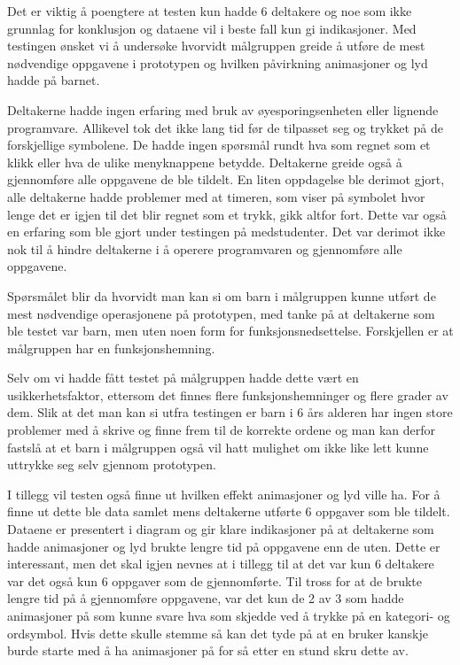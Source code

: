 Det er viktig å poengtere at testen kun hadde 6 deltakere og noe som ikke grunnlag for konklusjon og dataene vil i beste fall kun gi indikasjoner.  Med testingen ønsket vi å undersøke hvorvidt målgruppen greide å utføre de mest nødvendige oppgavene i prototypen og hvilken påvirkning animasjoner og lyd hadde på barnet.  
 
Deltakerne hadde ingen erfaring med bruk av øyesporingsenheten eller lignende programvare. Allikevel tok det ikke lang tid før de tilpasset seg og trykket på de forskjellige symbolene. De hadde ingen spørsmål rundt hva som regnet som et klikk eller hva de ulike menyknappene betydde. Deltakerne greide også å gjennomføre alle oppgavene de ble tildelt. En liten oppdagelse ble derimot gjort, alle deltakerne hadde problemer med at timeren, som viser på symbolet hvor lenge det er igjen til det blir regnet som et trykk, gikk altfor fort. Dette var også en erfaring som ble gjort under testingen på medstudenter.  Det var derimot ikke nok til å hindre deltakerne i å operere programvaren og gjennomføre alle oppgavene.

Spørsmålet blir da hvorvidt man kan si om barn i målgruppen kunne utført de mest nødvendige operasjonene på prototypen, med tanke på at deltakerne som ble testet var barn, men uten noen form for funksjonsnedsettelse. Forskjellen er at målgruppen har en funksjonshemning. 

Selv om vi hadde fått testet på målgruppen hadde dette vært en usikkerhetsfaktor, ettersom det finnes flere funksjonshemninger og flere grader av dem. Slik at det man kan si utfra testingen er barn i 6 års alderen har ingen store problemer med å skrive og finne frem til de korrekte ordene og man kan derfor fastslå at et barn i målgruppen også vil hatt mulighet om ikke like lett kunne uttrykke seg selv gjennom prototypen. 
 
I tillegg vil testen også finne ut hvilken effekt animasjoner og lyd ville ha. For å finne ut dette ble data samlet mens deltakerne utførte 6 oppgaver som ble tildelt. Dataene er presentert i diagram og gir klare indikasjoner på at deltakerne som hadde animasjoner og lyd brukte lengre tid på oppgavene enn de uten. Dette er interessant, men det skal igjen nevnes at i tillegg til at det var kun 6 deltakere var det også kun 6 oppgaver som de gjennomførte. Til tross for at de brukte lengre tid på å gjennomføre oppgavene, var det kun de 2 av 3 som hadde animasjoner på som kunne svare hva som skjedde ved å trykke på en kategori- og ordsymbol. Hvis dette skulle stemme så kan det tyde på at en bruker kanskje burde starte med å ha animasjoner på for så etter en stund skru dette av.  
 
